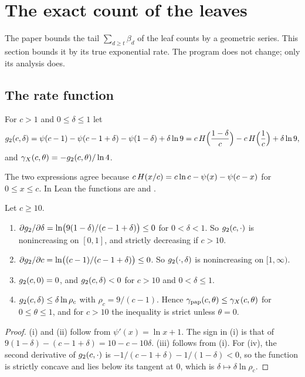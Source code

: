 \section{The exact count of the leaves}
\label{sec:exact}

The paper bounds the tail \(\sum_{d\ge t}\beta_d\) of the leaf counts by a
geometric series.  This section bounds it by its true exponential rate.  The
program does not change; only its analysis does.

\subsection{The rate function}

\begin{definition}\label{def:g2}
For \(c>1\) and \(0\le\delta\le1\) let
\[
  g_{2}(c,\delta)=\psi(c-1)-\psi(c-1+\delta)-\psi(1-\delta)+\delta\ln 9
  =c\,H\Bigl(\frac{1-\delta}{c}\Bigr)-c\,H\Bigl(\frac1c\Bigr)+\delta\ln 9,
\]
and \(\gamma_{X}(c,\theta)=-g_{2}(c,\theta)/\ln 4\).
\end{definition}

The two expressions agree because
\(c\,H(x/c)=c\ln c-\psi(x)-\psi(c-x)\) for \(0\le x\le c\).  In Lean the
functions are  and .

\begin{lemma}\label{lem:g2}
Let \(c\ge 10\).
\begin{enumerate}
\item \(\partial g_{2}/\partial\delta=\ln\bigl(9(1-\delta)/(c-1+\delta)\bigr)\le0\)
  for \(0<\delta<1\).  So \(g_{2}(c,\cdot)\) is nonincreasing on \([0,1]\), and
  strictly decreasing if \(c>10\).
\item \(\partial g_{2}/\partial c=\ln\bigl((c-1)/(c-1+\delta)\bigr)\le0\).  So
  \(g_{2}(\cdot,\delta)\) is nonincreasing on \([1,\infty)\).
\item \(g_{2}(c,0)=0\), and \(g_{2}(c,\delta)<0\) for \(c>10\) and
  \(0<\delta\le1\).
\item \(g_{2}(c,\delta)\le\delta\ln\rho_c\) with \(\rho_c=9/(c-1)\).  Hence
  \(\gamma_{\mathrm{pap}}(c,\theta)\le\gamma_{X}(c,\theta)\) for \(0\le\theta\le1\), and for \(c>10\)
  the inequality is strict unless \(\theta=0\).
\end{enumerate}
\end{lemma}

\begin{proof}
(i) and (ii) follow from \(\psi'(x)=\ln x+1\).  The sign in (i) is that of
\(9(1-\delta)-(c-1+\delta)=10-c-10\delta\).  (iii) follows from (i).  For (iv),
the second derivative of \(g_{2}(c,\cdot)\) is
\(-1/(c-1+\delta)-1/(1-\delta)<0\), so the function is strictly concave and lies
below its tangent at \(0\), which is \(\delta\mapsto\delta\ln\rho_c\).
\end{proof}

